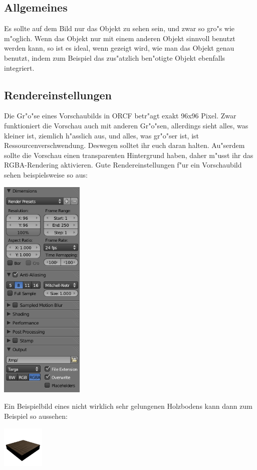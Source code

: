 \documentclass[a4paper]{article}
\begin{document}
\subsection{Allgemeines}
Es sollte auf dem Bild nur das Objekt zu sehen sein, und zwar so gro"s wie m"oglich. Wenn das Objekt nur mit einem anderen Objekt sinnvoll benutzt werden
kann, so ist es ideal, wenn gezeigt wird, wie man das Objekt genau benutzt, indem zum Beispiel das zus"atzlich ben"otigte Objekt ebenfalls integriert.

\subsection{Rendereinstellungen}
Die Gr"o"se eines Vorschaubilds in ORCF betr"agt exakt 96x96 Pixel. Zwar funktioniert die Vorschau auch mit anderen Gr"o"sen, allerdings sieht alles,
was kleiner ist, ziemlich h"asslich aus, und alles, was gr"o"ser ist, ist Ressourcenverschwendung. Deswegen solltet ihr euch daran halten. Au"serdem
sollte die Vorschau einen transparenten Hintergrund haben, daher m"usst ihr das RGBA-Rendering aktivieren. Gute Rendereinstellungen f"ur ein Vorschaubild
sehen beispielsweise so aus:
\begin{center}
\includegraphics[width=40mm]{../images/blender/preview-rendersettings.png}
\end{center}

Ein Beispielbild eines nicht wirklich sehr gelungenen Holzbodens kann dann zum Beispiel so aussehen:
\begin{center}
\includegraphics[width=20mm]{../images/blender/preview.png}
\end{center}
\end{document}
